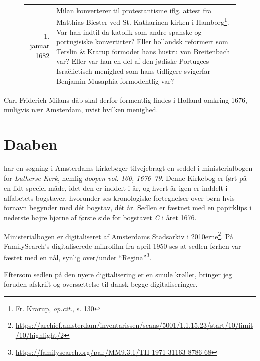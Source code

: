 \documentclass[
	a4paper,
	12pt,
	final
]{memoir}
\begin{document}
\begin{savenotes}
\begin{figure}[H]
\begin{tabular}{r p{}}
	1. januar 1682 & Milan konverterer til protestantisme iflg. attest fra Matthias Biester ved St. Katharinen-kirken i Hamborg\footnote{Fr. Krarup, \emph{op.cit.}, s. 130}. Var han indtil da katolik som andre spanske og portugisiske konvertitter? Eller hollandsk reformert som Terslin \& Krarup formoder hans hustru von Breitenbach var? Eller var han en del af den jødiske Portugees Israëlietisch menighed som hans tidligere svigerfar Benjamin Musaphia formodentlig var? \\
\end{tabular}%
\end{figure}%
\end{savenotes}

Carl Friderich Milans dåb skal derfor formentlig findes i Holland omkring 1676, muligvis nær Amsterdam, uvist hvilken menighed.

\clearpage%
\section{Daaben}

 har en søgning i Amsterdams kirkebøger tilvejebragt en seddel i ministerialbogen for \emph{Lutherse Kerk}, nemlig \emph{doopen vol. 160, 1676--79}. Denne Kirkebog er ført på en lidt speciel måde, idet den er inddelt i år, og hvert år igen er inddelt i alfabetets bogstaver, hvorunder ses kronologiske fortegnelser over børn hvis fornavn begynder med dét bogstav, dét år. Sedlen er fæstnet med en papirklips i nederste højre hjørne af første side for bogstavet \emph{C} i året 1676.

Ministerialbogen er digitaliseret af Amsterdams Stadsarkiv i 2010erne\footnote{\url{https://archief.amsterdam/inventarissen/scans/5001/1.1.15.23/start/10/limit/10/highlight/2}%
}. På FamilySearch's digitaliserede mikrofilm fra april 1950 ses at sedlen førhen var fæstet med en nål, synlig over/under \enquote{Regina}\footnote{\url{https://familysearch.org/pal:/MM9.3.1/TH-1971-31163-8786-68}}.

Eftersom sedlen på den nyere digitalisering er en smule krøllet, bringer jeg foruden afskrift og oversættelse til dansk begge digitaliseringer.
\end{document}
